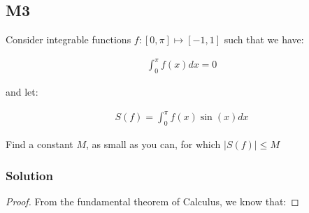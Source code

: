 \subsection*{M3}

Consider integrable functions $f: [0, \pi] \mapsto [{-1}, 1]$ such that we have:

\begin{gather} \label{eq:integrable_function}
    \int_{0}^{\pi}f(x) dx = 0
\end{gather}

and let:

\begin{gather} \label{eq:m3}
    S(f) = \int_{0}^{\pi} f(x)\sin(x) dx
\end{gather}

Find a constant $M$, as small as you can, for which $|S(f)| \leq M$

\subsubsection*{Solution}

\begin{proof}
From the fundamental theorem of Calculus, we know that:

\end{proof}